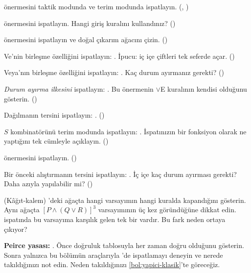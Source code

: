 \begin{alistirmalar}
  önermesini taktik modunda ve terim modunda
ispatlayın. (, )

  önermesini ispatlayın. Hangi giriş kuralını
kullandınız? ()

  önermesini ispatlayın ve
doğal çıkarım ağacını çizin. ()

 Ve'nin birleşme özelliğini ispatlayın:
. İpucu: 
iç içe çiftleri tek seferde açar. ()

 Veya'nın birleşme özelliğini ispatlayın:
. Kaç durum ayırmanız gerekti? ()

 \emph{Durum ayırma ilkesini} ispatlayın:
. Bu önermenin $\vee$E kuralının
kendisi olduğunu gösterin. ()

 Dağılmanın tersini ispatlayın:
. ()

\label{alis:s-kombinator} $S$ kombinatörünü terim modunda
ispatlayın: . İspatınızın bir
fonksiyon olarak ne yaptığını tek cümleyle açıklayın. ()

  önermesini
ispatlayın. ()

 Bir önceki alıştırmanın tersini ispatlayın:
. İç içe kaç durum ayırması gerekti?
Daha azıyla yapılabilir mi? ()

 (Kâğıt-kalem) 'deki ağaçta hangi
varsayımın hangi kuralda kapandığını gösterin. Aynı ağaçta $[P \wedge
(Q \vee R)]^3$ varsayımının üç kez göründüğüne dikkat edin. \Lean{}
ispatında bu varsayıma karşılık gelen tek bir  vardır. Bu fark
neden ortaya çıkıyor?

\label{alis:peirce} \textbf{Peirce yasası:}
. Önce doğruluk tablosuyla her zaman doğru
olduğunu gösterin. Sonra yalnızca bu bölümün araçlarıyla \Lean{}'de
ispatlamayı deneyin ve nerede takıldığınızı not edin. Neden takıldığınızı
\cref{bol:yapici-klasik}'te göreceğiz.
\end{alistirmalar}
